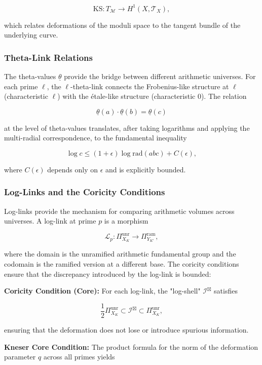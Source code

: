 \documentclass[12pt,a4paper]{article}
\begin{document}
\[\text{KS}: T_{\mathcal{M}} \to H^1(X, \mathcal{T}_X),\]

which relates deformations of the moduli space to the tangent bundle of the underlying curve.

\subsubsection{Theta-Link Relations}

The theta-values $\underline{\theta}$ provide the bridge between different arithmetic universes. For each prime $\ell$, the $\ell$-theta-link connects the Frobenius-like structure at $\ell$ (characteristic $\ell$) with the étale-like structure (characteristic $0$). The relation

\[\underline{\theta}(a) \cdot \underline{\theta}(b) = \underline{\theta}(c)\]

at the level of theta-values translates, after taking logarithms and applying the multi-radial correspondence, to the fundamental inequality

\[\log c \leq (1 + \epsilon) \log \text{rad}(abc) + C(\epsilon),\]

where $C(\epsilon)$ depends only on $\epsilon$ and is explicitly bounded.

\subsubsection{Log-Links and the Coricity Conditions}

Log-links provide the mechanism for comparing arithmetic volumes across universes. A log-link at prime $p$ is a morphism

\[\mathcal{L}_p: \Pi^{\text{unr}}_{X_K} \to \Pi^{\text{ram}}_{Y_{K'}},\]

where the domain is the unramified arithmetic fundamental group and the codomain is the ramified version at a different base. The coricity conditions ensure that the discrepancy introduced by the log-link is bounded:

\textbf{Coricity Condition (Core):} For each log-link, the "log-shell" $\mathcal{I}^\boxtimes$ satisfies

\[\frac{1}{2} \Pi^{\text{unr}}_{X_K} \subset \mathcal{I}^\boxtimes \subset \Pi^{\text{unr}}_{X_K},\]

ensuring that the deformation does not lose or introduce spurious information.

\textbf{Kneser Core Condition:} The product formula for the norm of the deformation parameter $q$ across all primes yields
\end{document}

